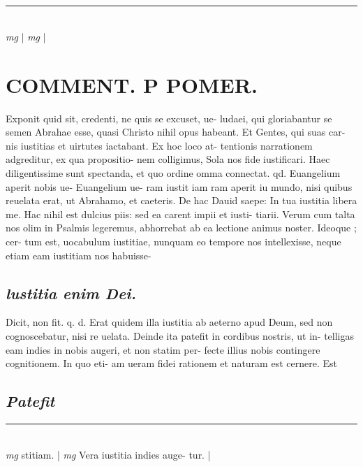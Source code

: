 \documentclass{article}
\begin{document}
\begin{pages}
\subsection*{\textit{}}
\vspace{0.5cm}\noindent
\vspace{0.2cm}\rule{1cm}{0.2pt}\\ 
\hspace{0.2cm}\textit{mg}
\footnotesize 
\normalsize| 
\hspace{0.2cm}\textit{mg}
\footnotesize 
\normalsize| 
\section*{COMMENT. P POMER.  }\pstart Exponit quid sit, credenti, ne quis se excuset, ue- ludaei, qui gloriabantur se semen Abrahae esse, quasi Christo nihil opus habeant. Et Gentes, qui suas car- nis iustitias et uirtutes iactabant. Ex hoc loco at- tentionis narrationem adgreditur, ex qua propositio- nem colligimus, Sola nos fide iustificari.   \pend\pstart Haec diligentissime sunt spectanda, et quo ordine omma connectat. qd. Euangelium aperit nobis ue- Euangelium ue- ram iustit iam ram aperit iu   mundo, nisi quibus reuelata erat, ut Abrahamo, et caeteris. De hac Dauid saepe: In tua iustitia libera me.  Hac nihil est dulcius piis: sed ea carent impii et iusti- tiarii. Verum cum talta nos olim in Psalmis legeremus, abhorrebat ab ea lectione animus noster. Ideoque ; cer- tum est, uocabulum iustitiae, nunquam eo tempore nos intellexisse, neque etiam eam iustitiam nos habuisse-  \pend
{}
{}
\subsection*{\textit{lustitia enim Dei. }}\pstart Dicit, non fit. q. d. Erat quidem illa iustitia ab aeterno apud Deum, sed non cognoscebatur, nisi re uelata. Deinde ita patefit in cordibus nostris, ut in- telligas eam indies in nobis augeri, et non statim per- fecte illius nobis contingere cognitionem. In quo eti- am ueram fidei rationem et naturam est cernere. Est  \pend
{}
{}
\subsection*{\textit{Patefit }}
\vspace{0.5cm}\noindent
\vspace{0.2cm}\rule{1cm}{0.2pt}\\ 
\hspace{0.2cm}\textit{mg}
\footnotesize stitiam.  
\normalsize| 
\hspace{0.2cm}\textit{mg}
\footnotesize Vera iustitia indies auge- tur. 
\normalsize| 

\end{pages}
\end{document}

